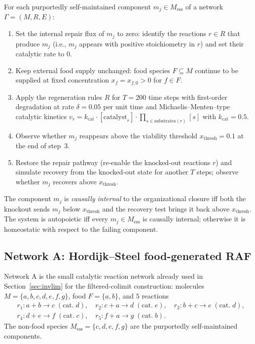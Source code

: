 \documentclass[11pt,a4paper]{article}
\theoremstyle{plain}
\theoremstyle{definition}
\theoremstyle{remark}
\begin{document}
For each purportedly self-maintained component $m_{j}\in
M_{\mathrm{ess}}$ of a network $\Gamma=(M,R,E)$:
\begin{enumerate}[leftmargin=*,itemsep=2pt]
\item Set the internal repair flux of $m_{j}$ to zero: identify the
reactions $r\in R$ that produce $m_{j}$ (i.e., $m_{j}$ appears with
positive stoichiometry in $r$) and set their catalytic rate to $0$.
\item Keep external food supply unchanged: food species
$F\subseteq M$ continue to be supplied at fixed concentration
$x_{f}=x_{f,0}>0$ for $f\in F$.
\item Apply the regeneration rules $R$ for $T=200$ time steps with
first-order degradation at rate $\delta=0.05$ per unit time and
Michaelis--Menten--type catalytic kinetics $v_{r}=k_{\mathrm{cat}}\cdot
[\mathrm{catalyst}_{r}]\cdot\prod_{s\in\mathrm{substrates}(r)}[s]$ with
$k_{\mathrm{cat}}=0.5$.
\item Observe whether $m_{j}$ reappears above the viability threshold
$x_{\mathrm{thresh}}=0.1$ at the end of step~3.
\item Restore the repair pathway (re-enable the knocked-out reactions
$r$) and simulate recovery from the knocked-out state for another $T$
steps; observe whether $m_{j}$ recovers above $x_{\mathrm{thresh}}$.
\end{enumerate}
The component $m_{j}$ is \emph{causally internal} to the
organizational closure iff both the knockout sends $m_{j}$ below
$x_{\mathrm{thresh}}$ and the recovery test brings it back above
$x_{\mathrm{thresh}}$. The system is autopoietic iff every $m_{j}\in
M_{\mathrm{ess}}$ is causally internal; otherwise it is homeostatic
with respect to the failing component.

\subsection{Network A: Hordijk--Steel food-generated RAF}

Network A is the small catalytic reaction network already used in
Section~\ref{sec:invlim} for the filtered-colimit construction:
molecules $M=\{a,b,c,d,e,f,g\}$, food $F=\{a,b\}$, and $5$ reactions
\begin{equation*}
\begin{aligned}
&r_{1}:a+b\to c\;(\text{cat.}\;d),\quad
r_{2}:c+a\to d\;(\text{cat.}\;e),\quad
r_{3}:b+c\to e\;(\text{cat.}\;d),\\
&r_{4}:d+e\to f\;(\text{cat.}\;c),\quad
r_{5}:f+a\to g\;(\text{cat.}\;b).
\end{aligned}
\end{equation*}
The non-food species $M_{\mathrm{ess}}=\{c,d,e,f,g\}$ are the
purportedly self-maintained components.
\end{document}
